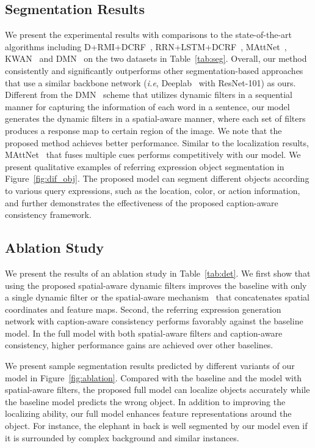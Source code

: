 \documentclass{bmvc2k}
\def\ie{\emph{i.e}\bmvaOneDot}
\begin{document}
\subsection{Segmentation Results}
We present the experimental results with comparisons to the state-of-the-art algorithms including D+RMI+DCRF~\cite{Liu_ICCV_2017}, RRN+LSTM+DCRF~\cite{Li_CVPR_2018}, MAttNet~\cite{Yu_CVPR_2018}, KWAN~\cite{Shi_ECCV_2018} and DMN~\cite{Margffoy-Tuay_ECCV_2018} on the two datasets in Table~\ref{tab:seg}.
Overall, our method consistently and significantly outperforms other segmentation-based approaches that use a similar backbone network (\ie, Deeplab~\cite{CP2016Deeplab} with ResNet-101) as ours.
Different from the DMN~\cite{Margffoy-Tuay_ECCV_2018} scheme that utilizes dynamic filters in a sequential manner for capturing the information of each word in a sentence, our model generates the dynamic filters in a spatial-aware manner, where each set of filters produces a response map to certain region of the image.
We note that the proposed method achieves better performance.
Similar to the localization results, MAttNet~\cite{Yu_CVPR_2018} that fuses multiple cues performs competitively with our model.
We present qualitative examples of referring expression object segmentation in Figure~\ref{fig:dif_obj}. 
The proposed model can segment different objects according to various query expressions, such as the location, color, or action information, and further demonstrates the effectiveness of the proposed caption-aware consistency framework.
\subsection{Ablation Study}
We present the results of an ablation study in Table~\ref{tab:det}.
We first show that using the proposed spatial-aware dynamic filters improves the baseline with only a single dynamic filter or the spatial-aware mechanism~\cite{Hu_ECCV_2016} that concatenates spatial coordinates and feature maps.
Second, the referring expression generation network with caption-aware consistency performs favorably against the baseline model.
In the full model with both spatial-aware filters and caption-aware consistency, higher performance gains are achieved over other baselines.


We present sample segmentation results predicted by different variants of our model in Figure~\ref{fig:ablation}. 
Compared with the baseline and the model with spatial-aware filters, the proposed full model can localize objects accurately while the baseline model predicts the wrong object. 
In addition to improving the localizing ability, our full model enhances feature representations around the object. 
For instance, the elephant in back is well segmented by our model even if it is surrounded by  complex background and similar instances.
\end{document}
